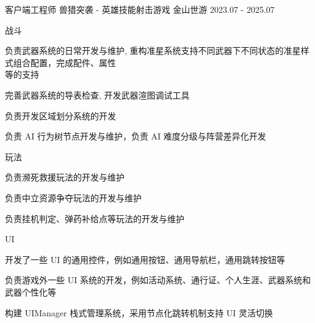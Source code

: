 

\begin{cventries}

\cventry
    {客户端工程师} %
    {兽猎突袭 -  英雄技能射击游戏} %
    {金山世游} %
    {2023.07 - 2025.07} %
    {
        \begin{cvitems}
            \item {战斗
                \begin{cvsubitems}
                    \item {负责武器系统的日常开发与维护, 重构准星系统支持不同武器下不同状态的准星样式组合配置，完成配件、属性\\等的支持}
                    \item {完善武器系统的导表检查, 开发武器渲图调试工具}
                    \item {负责开发区域划分系统的开发}
                    \item {负责 AI 行为树节点开发与维护，负责 AI 难度分级与阵营差异化开发}
                \end{cvsubitems}
            }
            \item {玩法
                \begin{cvsubitems}
                    \item {负责濒死救援玩法的开发与维护}
                    \item {负责中立资源争夺玩法的开发与维护}
                    \item {负责挂机判定、弹药补给点等玩法的开发与维护}
                \end{cvsubitems}
            }
            \item {UI
                \begin{cvsubitems}
                    \item {开发了一些 UI 的通用控件，例如通用按钮、通用导航栏，通用跳转按钮等}
                    \item {负责游戏外一些 UI 系统的开发，例如活动系统、通行证、个人生涯、武器系统和武器个性化等}
                    \item {构建 UIManager 栈式管理系统，采用节点化跳转机制支持 UI 灵活切换}

\end{cvsubitems}}
\end{cvitems}}
\end{cventries}
